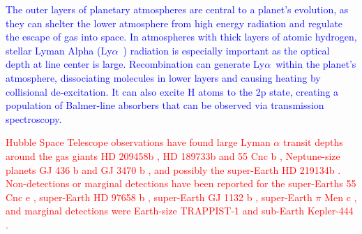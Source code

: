 \documentclass{aastex63}
\newcommand{\todo}[1]{\textcolor{red}{#1}}
\newcommand{\proposed}[1]{\textcolor{blue}{#1}}
\newcommand\lya{Ly$\alpha$\ }
\begin{document}
\proposed{
The outer layers of planetary atmospheres are central to a planet's evolution, as they can shelter the lower atmosphere from high energy radiation and regulate the escape of gas into space. In atmospheres with thick layers of atomic hydrogen, stellar Lyman Alpha (\lya) radiation is especially important as the optical depth at line center is large. Recombination can generate \lya within the planet's atmosphere, dissociating molecules in lower layers and causing heating by collisional de-excitation. It can also excite H atoms to the 2p state, creating a population of Balmer-line absorbers that can be observed via transmission spectroscopy. } %

\ifx
\todo{
Hubble Space Telescope observations have found large Lyman $\alpha$ transit depths around the gas giants HD 209458b \citep{2003Natur.422..143V}, HD 189733b \citep{2012A&A...543L...4L} and 55 Cnc b \citep{2012A&A...547A..18E}, Neptune-size planets GJ 436 b 
\citep{2015Natur.522..459E}
and GJ 3470 b \citep{2018A&A...620A.147B}, and possibly the super-Earth HD 219134b \citep{2019EPSC...13.1928L}.
Non-detections or marginal detections have been reported for the super-Earths 55 Cnc e \citep{2012A&A...547A..18E}, super-Earth HD 97658 b \citep{2017A&A...597A..26B} , super-Earth GJ 1132 b \citep{2019AJ....158...50W}, super-Earth $\pi$ Men c \citep{2020ApJ...888L..21G}, and marginal detections were  Earth-size TRAPPIST-1 \citep{2017A&A...599L...3B} and sub-Earth Kepler-444 \citep{2017A&A...602A.106B}.
}
\fi


\end{document}
